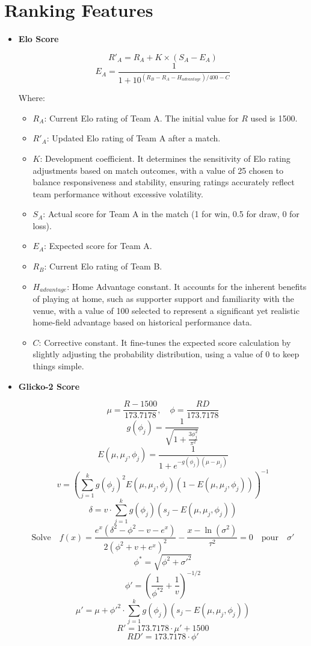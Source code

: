 

\chapter{Ranking Features}
\label{appendix:ranking_features}


\begin{itemize}

\item \textbf{Elo Score}
\label{par:elo_score}


\[
    R'_A = R_A + K \times (S_A - E_A)
\]
\[
    E_A = \frac{1}{1 + 10^{(R_B - R_A - H_{advantage})/400 - C}}
\]

Where:
\begin{itemize}
    \item $R_A$: Current Elo rating of Team A. The initial value for $R$ used is 1500.
    \item $R'_A$: Updated Elo rating of Team A after a match.
    \item $K$: Development coefficient. It determines the sensitivity of Elo rating adjustments based on match outcomes, with a value of 25 chosen to balance responsiveness and stability, ensuring ratings accurately reflect team performance without excessive volatility.
    \item $S_A$: Actual score for Team A in the match (1 for win, 0.5 for draw, 0 for loss).
    \item $E_A$: Expected score for Team A.

    \item $R_B$: Current Elo rating of Team B.
    \item $H_{advantage}$: Home Advantage constant. It accounts for the inherent benefits of playing at home, such as supporter support and familiarity with the venue, with a value of 100 selected to represent a significant yet realistic home-field advantage based on historical performance data.
    \item $C$: Corrective constant. It fine-tunes the expected score calculation by slightly adjusting the probability distribution, using a value of 0 to keep things simple.
\end{itemize}



\item \textbf{Glicko-2 Score}
\label{par:glicko2_score}


\[
\mu = \frac{R - 1500}{173.7178}, \quad \phi = \frac{RD}{173.7178}
\]
\[
g(\phi_j) = \frac{1}{\sqrt{1 + \frac{3\phi_j^2}{\pi^2}}}
\]
\[
E(\mu, \mu_j, \phi_j) = \frac{1}{1 + e^{-g(\phi_j)(\mu - \mu_j)}}
\]
\[
v = \left( \sum_{j=1}^{k} g(\phi_j)^2 E(\mu, \mu_j, \phi_j) (1 - E(\mu, \mu_j, \phi_j)) \right)^{-1}
\]
\[
\delta = v \cdot \sum_{j=1}^{k} g(\phi_j) (s_j - E(\mu, \mu_j, \phi_j)) 
\]
\[
\text{Solve} \quad f(x) = \frac{e^x (\delta^2 - \phi^2 - v - e^x)}{2 (\phi^2 + v + e^x)^2} - \frac{x - \ln(\sigma^2)}{\tau^2} = 0 \quad \text{pour} \quad \sigma'
\]
\[
\phi^* = \sqrt{\phi^2 + \sigma'^2}
\]
\[
\phi' = \left( \frac{1}{\phi^{*2}} + \frac{1}{v} \right)^{-1/2}
\]
\[
\mu' = \mu + \phi'^2 \cdot \sum_{j=1}^{k} g(\phi_j) (s_j - E(\mu, \mu_j, \phi_j))
\]
\[
R' = 173.7178 \cdot \mu' + 1500
\]
\[
RD' = 173.7178 \cdot \phi'
\]



\end{itemize}
